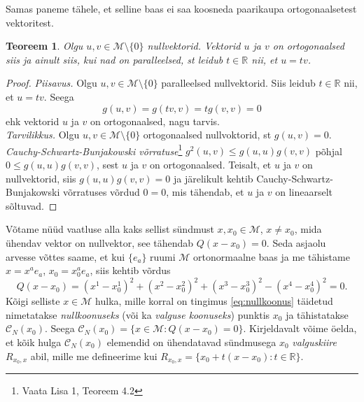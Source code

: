 \documentclass[a4paper,12pt]{article}
\newtheorem{teoreem}{Teoreem}[section]
\numberwithin{equation}{section}
\begin{document}
Samas paneme tähele, et selline baas ei saa koosneda paarikaupa ortogonaalsetest vektoritest.
\begin{teoreem}
Olgu $u, v \in \mathcal{M} \setminus \{0\}$ nullvektorid. Vektorid $u$ ja $v$ on ortogonaalsed siis ja ainult siis, kui nad on paralleelsed, st leidub $t \in \mathbb{R}$ nii, et $u = tv$.
\end{teoreem}
\begin{proof}
\emph{Piisavus.} Olgu $u, v \in \mathcal{M} \setminus \{0\}$ paralleelsed nullvektorid. Siis leidub $t \in \mathbb{R}$ nii, et $u = tv$. Seega
\[g\left(u, v\right) = g \left(tv, v\right) = t g \left(v, v\right) = 0\]
ehk vektorid $u$ ja $v$ on ortogonaalsed, nagu tarvis.
\\
\emph{Tarvilikkus.} Olgu $u, v \in \mathcal{M} \setminus \{0\}$ ortogonaalsed nullvoktorid, st $g \left(u, v\right) = 0$. \emph{Cauchy-Schwartz-Bunjakowski võrratuse}\footnote{Vaata Lisa 1, Teoreem 4.2} $g^2 \left(u, v \right) \leq g \left(u, u \right) g \left(v, v \right)$ põhjal $0 \leq g \left(u, u \right) g \left(v, v \right)$, sest $u$ ja $v$ on ortogonaalsed. Teisalt, et $u$ ja $v$ on nullvektorid, siis $g \left(u, u \right) g \left(v, v \right) = 0$ ja järelikult kehtib Cauchy-Schwartz-Bunjakowski võrratuses võrdud $0 = 0$, mis tähendab, et $u$ ja $v$ on lineaarselt sõltuvad.
\end{proof}

Võtame nüüd vaatluse alla kaks sellist sündmust $x, x_0 \in \mathcal{M}$, $x \neq x_0$, mida ühendav vektor on nullvektor, see tähendab $Q \left(x- x_0\right) = 0$. Seda asjaolu arvesse võttes saame, et kui $\{e_a\}$ ruumi $\mathcal{M}$ ortonormaalne baas ja me tähistame $x = x^a e_a$, $x_0 = x_0^a e_a$, siis kehtib võrdus
\begin{equation} \label{eq:nullkoonus}
Q \left(x - x_0\right) = \left(x^1 - x_0^1\right)^2 + \left(x^2 - x_0^2\right)^2 + \left(x^3 - x_0^3\right)^2 - \left(x^4 - x_0^4\right)^2 = 0.
\end{equation}
Kõigi selliste $x \in \mathcal{M}$ hulka, mille korral on tingimus \ref{eq:nullkoonus} täidetud nimetatakse \emph{nullkoonuseks} (või ka \emph{valguse koonuseks}) punktis $x_0$ ja tähistatakse $\mathcal{C}_N\left(x_0\right)$. Seega $\mathcal{C}_N\left(x_0\right) = \{x \in \mathcal{M} : Q \left(x- x_0\right) = 0 \}$. Kirjeldavalt võime öelda, et kõik hulga $\mathcal{C}_N\left(x_0\right)$ elemendid on ühendatavad sündmusega $x_0$ \emph{valguskiire} $R_{x_0, x}$ abil, mille me defineerime kui $R_{x_0, x} = \{x_0 + t\left(x - x_0\right) : t \in \mathbb{R} \}$.
\end{document}
